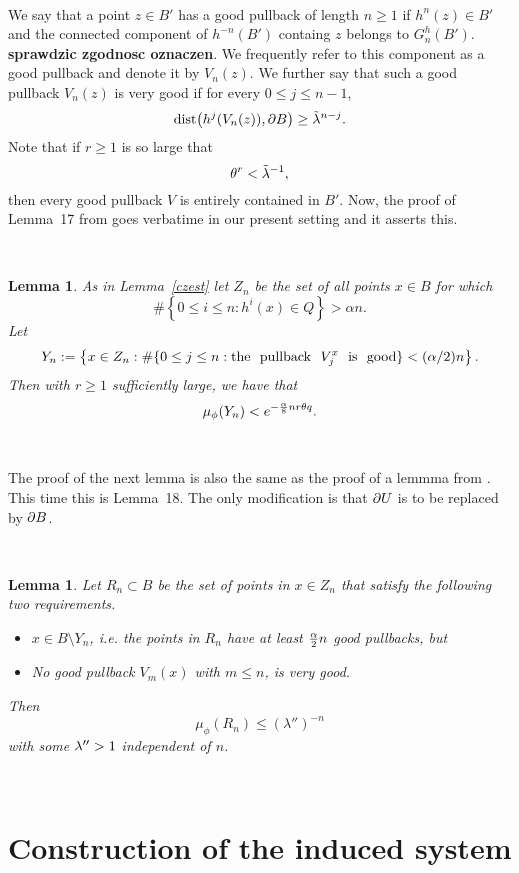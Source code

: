 \documentclass[12pt]{amsart}
\numberwithin{equation}{section}
\newcommand{\blem}{\begin{lem}}
\newcommand{\elem}{\end{lem}}
\newtheorem{lem}[thm]{Lemma}
\def\dist{\text{{\rm dist}}}  \def\Dist{\text{{\rm Dist}}}
\def\({\bigl(}                \def\){\bigr)}
\def\lt{\left}                \def\rt{\right}
\begin{document}
\

\fr We say that a point $z\in B'$ has a good pullback of length $n\ge
1$ if $h^n(z)\in B'$ and the connected component of $h^{-n}(B')$
containg $z$ belongs to $G^h_{n}(B')$. {\bf sprawdzic zgodnosc oznaczen}. We frequently refer to this
component as a good pullback and denote it by $V_n(z)$. We further say
that such a good pullback $V_n(z)$ is very good if for every $0\le j\le n-1$,
$$
\dist\(h^j(V_n(z)),\bd B\)\ge \tilde\l^{n-j}.
$$
Note that if $r\ge 1$ is so large that 
$$
\theta^r< \tilde{\lambda}^{-1},
$$
then every good pullback $V$ is entirely contained in $B'$. Now, the
proof of Lemma~17 from \cite{SUZ1} goes verbatime in our present
setting and it asserts this. 

\

\blem\label{Yn}
As in Lemma~\ref{czest} let $Z_n$ be the set of all points $x\in B$ for which
$$
\# \left\{0\le i\le n:h^i(x)\in Q\right\}>\alpha n.
$$
Let
$$
Y_n
:=\lt\{x\in Z_n:\#\{0\le j\le n:{\rm the ~~pullback~~}V^x_j{\rm ~~is~~
     good}\}<(\alpha/2)n\rt\}.
$$
Then with $r\ge 1$ sufficiently large, we have that 
$$
\mu_\phi(Y_n)<e^{-{\alpha\over 8}nr\theta q}.
$$
\elem

\

\fr The proof of the next lemma is also the same as the proof of a lemmma
from \cite{SUZ1}. This time this is Lemma~18. The only modification is
that $\partial U$ is to be replaced by $\partial B$. 

\

\blem\label{verygood}
Let $R_n\subset B$ be the set of points in $x\in Z_n$ that satisfy the
following two requirements.

\begin{itemize}
\item[(1)]$x\in B\setminus Y_n$, i.e. the points in $R_n$ have
  at least ${\alpha\over 2}n$ good pullbacks, but 
\item[(2)] No good pullback $V_m(x)$ with $m\le n$, is very good. 
\end{itemize}
Then
$$
\mu_\phi(R_n)\le (\lambda'')^{-n}
$$
with some $\lambda''>1$ independent of $n$.
\elem

\

\section{Construction of the induced system}\label{constr}
\end{document}
